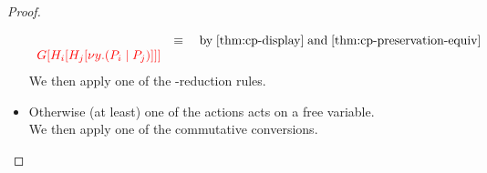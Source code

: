 \begin{proof}
\begin{itemize}
\begin{gather*}
\begin{array}{ll}
        & \equiv \quad \text{by} \; \cref{thm:cp-display} \; \text{and} \;
          \cref{thm:cp-preservation-equiv}
        \\
        \tm{\cpPlug{G}{\cpPlug{H_i}{\cpPlug{H_j}{\cpCut{y}{P_i}{P_j}}}}} 
      \end{array}
    \end{gather*}
    We then apply one of the \textbeta-reduction rules.
  \item
    Otherwise (at least) one of the actions acts on a free variable.
    \\
    We then apply one of the commutative conversions.
  \end{itemize}
\end{proof}
